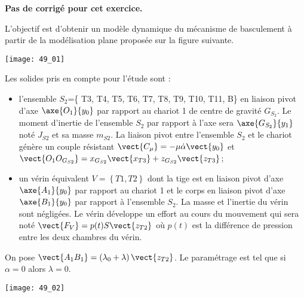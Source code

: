 \normalfalse \difficiletrue \tdifficilefalse
\correctionfalse



\setcounter{numques}{0}
\ifcorrection
\else
\textbf{Pas de corrigé pour cet exercice.}
\fi

\ifprof
\else

L’objectif est d’obtenir un modèle dynamique du mécanisme de basculement à partir de la modélisation plane proposée sur la figure suivante.


\begin{center}
\texttt{[image: 49\_01]}
\end{center}

Les solides pris en compte pour l’étude sont :
\begin{itemize}
\item l'ensemble $S_2$=\{ T3, T4, T5, T6, T7, T8, T9, T10, T11, B\} en liaison pivot d'axe $\axe{O_1}{y_0}$ par rapport au chariot 1 de centre de gravité $G_{S_2}$. Le moment d’inertie de l’ensemble $S_2$ par rapport à l’axe sera $\axe{G_{S_2}}{y_1}$ noté $J_{S2}$ et sa masse $m_{S2}$. La liaison pivot entre l’ensemble $S_2$ et le chariot génère un couple résistant $\vect{C_{\mu}}=-\mu\dot{\alpha}\vect{y_0}$ et $\vect{O_1O_{G_{S2}}}=x_{G_{S2}} \vect{x_{T3}}+z_{G_{S2}} \vect{z_{T3}}$; 
\item un vérin équivalent $V=\left\{ T1,T2\right\}$ dont la tige est en liaison pivot d’axe $\axe{A_1}{y_0}$ par rapport au chariot 1 et le corps en liaison pivot d’axe $\axe{B_1}{y_0}$ par rapport à l’ensemble $S_2$. La masse et l’inertie du vérin sont négligées. Le vérin développe un effort au cours du mouvement qui sera noté $\vect{F_V} = p(t) S \vect{z_{T2}}$ où $p(t)$ est la différence de pression entre les deux chambres du vérin.
\end{itemize}


On pose $\vect{A_1B_1} = \left( \lambda_0+\lambda\right)\vect{z_{T2}}$. Le paramétrage est tel que si $\alpha=0$ alors $\lambda=0$.
\fi



\ifprof
\begin{center}
\texttt{[image: 49\_02]}
\end{center}

